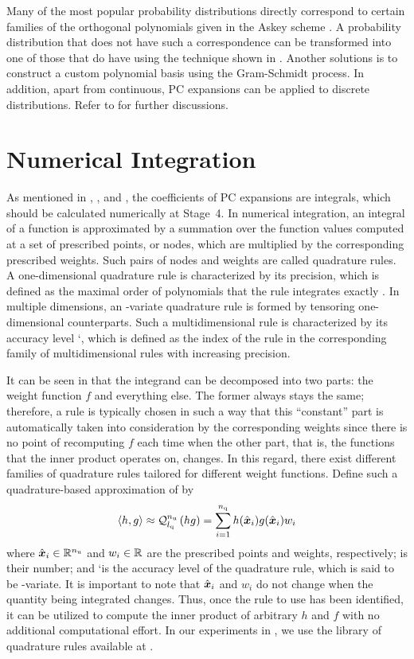 Many of the most popular probability distributions directly correspond to
certain families of the orthogonal polynomials given in the Askey scheme
\cite{xiu2010}. A probability distribution that does not have such a
correspondence can be transformed into one of those that do have using the
technique shown in . Another solutions is to
construct a custom polynomial basis using the Gram-Schmidt process. In addition,
apart from continuous, PC expansions can be applied to discrete distributions.
Refer to \cite{xiu2010} for further discussions.

\section{Numerical Integration}

As mentioned in , , and
, the coefficients of PC expansions are integrals, which
should be calculated numerically at Stage~4. In numerical integration, an
integral of a function is approximated by a summation over the function values
computed at a set of prescribed points, or nodes, which are multiplied by the
corresponding prescribed weights. Such pairs of nodes and weights are called
quadrature rules. A one-dimensional quadrature rule is characterized by its
precision, which is defined as the maximal order of polynomials that the rule
integrates exactly \cite{heiss2008}. In multiple dimensions, an \nu-variate
quadrature rule is formed by tensoring one-dimensional counterparts. Such a
multidimensional rule is characterized by its accuracy level \lq, which is
defined as the index of the rule in the corresponding family of multidimensional
rules with increasing precision.

It can be seen in  that the integrand can be decomposed into
two parts: the weight function $f$ and everything else. The former always stays
the same; therefore, a rule is typically chosen in such a way that this
``constant'' part is automatically taken into consideration by the corresponding
weights since there is no point of recomputing $f$ each time when the other
part, that is, the functions that the inner product operates on, changes. In
this regard, there exist different families of quadrature rules tailored for
different weight functions. Define such a quadrature-based approximation of
 by
\begin{equation} \elab{quadrature}
  \innerproduct{h}{g} \approx \quadrature{\nu}{\lq}{h g}
  = \sum_{i = 1}^\nq h(\hat{\v{x}}_i) g(\hat{\v{x}}_i) w_i
\end{equation}
where $\hat{\boldsymbol{x}}_i \in \mathbb{R}^{n_\mathrm{u}}$ and $w_i \in \mathbb{R}$ are the prescribed
points and weights, respectively; \nq is their number; and \lq is the accuracy
level of the quadrature rule, which is said to be \nu-variate. It is important
to note that $\hat{\boldsymbol{x}}_i$ and $w_i$ do not change when the quantity being
integrated changes. Thus, once the rule to use has been identified, it can be
utilized to compute the inner product of arbitrary $h$ and $f$ with no
additional computational effort. In our experiments in
, we use the library of quadrature rules available at
\cite{burkardt2013}.

